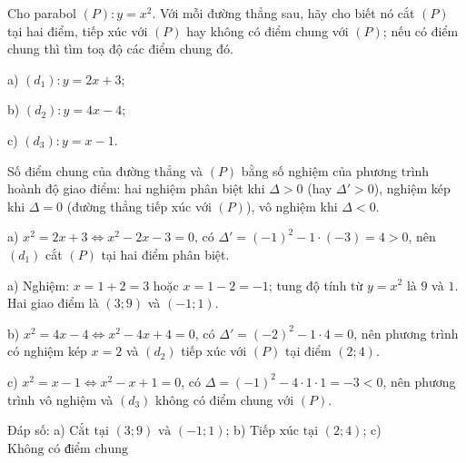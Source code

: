\begin{problem}[9DS-HSB2-038]
Cho parabol $(P)\colon y = x^2$. Với mỗi đường thẳng sau, hãy cho biết nó cắt $(P)$ tại hai điểm, tiếp xúc với $(P)$ hay không có điểm chung với $(P)$; nếu có điểm chung thì tìm toạ độ các điểm chung đó.

a) $(d_1)\colon y = 2x + 3$;

b) $(d_2)\colon y = 4x - 4$;

c) $(d_3)\colon y = x - 1$.

\begin{solution}
Số điểm chung của đường thẳng và $(P)$ bằng số nghiệm của phương trình hoành độ giao điểm: hai nghiệm phân biệt khi $\Delta > 0$ (hay $\Delta' > 0$), nghiệm kép khi $\Delta = 0$ (đường thẳng tiếp xúc với $(P)$), vô nghiệm khi $\Delta < 0$.

a) $x^2 = 2x + 3 \Leftrightarrow x^2 - 2x - 3 = 0$, có $\Delta' = (-1)^2 - 1 \cdot (-3) = 4 > 0$, nên $(d_1)$ cắt $(P)$ tại hai điểm phân biệt.

a) Nghiệm: $x = 1 + 2 = 3$ hoặc $x = 1 - 2 = -1$; tung độ tính từ $y = x^2$ là $9$ và $1$. Hai giao điểm là $(3; 9)$ và $(-1; 1)$.

b) $x^2 = 4x - 4 \Leftrightarrow x^2 - 4x + 4 = 0$, có $\Delta' = (-2)^2 - 1 \cdot 4 = 0$, nên phương trình có nghiệm kép $x = 2$ và $(d_2)$ tiếp xúc với $(P)$ tại điểm $(2; 4)$.

c) $x^2 = x - 1 \Leftrightarrow x^2 - x + 1 = 0$, có $\Delta = (-1)^2 - 4 \cdot 1 \cdot 1 = -3 < 0$, nên phương trình vô nghiệm và $(d_3)$ không có điểm chung với $(P)$.

Đáp số: a) $\boxed{\text{Cắt tại } (3; 9) \text{ và } (-1; 1)}$; b) $\boxed{\text{Tiếp xúc tại } (2; 4)}$; c) $\boxed{\text{Không có điểm chung}}$
\end{solution}
\end{problem}

